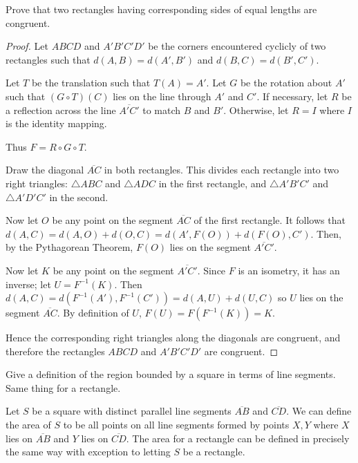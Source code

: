 \begin{tcolorbox}[title=Problem 8, breakable]
    Prove that two rectangles having corresponding sides 
        of equal lengths are congruent.
\end{tcolorbox}

\begin{proof}
    Let $ABCD$ and $A'B'C'D'$ be the corners encountered cyclicly of two rectangles such that 
        $d(A,B) = d(A',B')$ and $d(B,C) = d(B',C')$.

    Let $T$ be the translation such that $T(A) = A'$.
    Let $G$ be the rotation about $A'$ such that $(G \circ T)(C)$ lies on the line through $A'$ and $C'$.
    If necessary, let $R$ be a reflection across the line $\overline{A'C'}$ to match $B$ and $B'$.
    Otherwise, let $R = I$ where $I$ is the identity mapping.
    
    Thus $F = R \circ G \circ T$.

    Draw the diagonal $\overline{AC}$ in both rectangles. 
    This divides each rectangle into two right triangles: 
        $\triangle ABC$ and $\triangle ADC$ in the first rectangle, 
        and $\triangle A'B'C'$ and $\triangle A'D'C'$ in the second.

    Now let $O$ be any point on the segment $\overline{AC}$ of the first rectangle.
    It follows that $d(A,C) = d(A,O) + d(O,C) = d(A',F(O)) + d(F(O),C')$. 
    Then, by the Pythagorean Theorem, $F(O)$ lies on the segment $\overline{A'C'}$.

    Now let $K$ be any point on the segment $\overline{A'C'}$.  
    Since $F$ is an isometry, it has an inverse; let $U = F^{-1}(K)$.  
    Then $d(A,C) = d(F^{-1}(A'), F^{-1}(C')) = d(A,U) + d(U,C)$
        so $U$ lies on the segment $\overline{AC}$.  
    By definition of $U$, $F(U) = F(F^{-1}(K)) = K$.

    Hence the corresponding right triangles along the diagonals are congruent, 
        and therefore the rectangles $ABCD$ and $A'B'C'D'$ are congruent.
\end{proof}

\begin{tcolorbox}[title=Problem 9, breakable]
    Give a definition of the region bounded by a square in terms of line 
        segments. Same thing for a rectangle.
\end{tcolorbox}

\begin{definition}
    Let $S$ be a square with distinct parallel line segments $\overline{AB}$ and $\overline{CD}$.
    We can define the area of $S$ to be all points on all line segments formed by 
        points $X, Y$ where $X$ lies on $\overline{AB}$ and $Y$ lies on $\overline{CD}$.
    The area for a rectangle can be defined in precisely the same way
        with exception to letting $S$ be a rectangle.
\end{definition}


